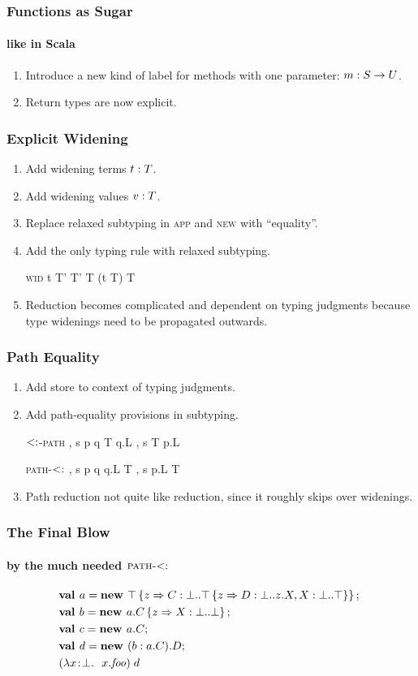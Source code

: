 \documentclass{beamer}
\begin{document}
\begin{frame}
\frametitle{Functions as Sugar}
\framesubtitle{like in Scala}
\begin{enumerate}
\item Introduce a new kind of label for methods with one parameter: $m : S \rightarrow U$.
\item Return types are now explicit.
\end{enumerate}
\end{frame}

\begin{frame}
\frametitle{Explicit Widening}
\begin{enumerate}
\item Add widening terms $t : T$.
\item Add widening values $v : T$.
\item Replace relaxed subtyping in \textsc{app} and \textsc{new} with
  ``equality''.
\item Add the only typing rule with relaxed subtyping.
\begin{block}{\textsc{wid}}
  \infrule
  {\Gamma \ts t \typ T' \spcomma T' \sub T}
  {\Gamma \ts (\wid t T) \typ T}
\end{block}
\item Reduction becomes complicated and dependent on typing judgments
  because type widenings need to be propagated outwards.
\end{enumerate}
\end{frame}

\begin{frame}
\frametitle{Path Equality}
\begin{enumerate}
\item Add store to context of typing judgments.
\item Add path-equality provisions in subtyping.
\begin{block}{\textsc{$<:$-path}}
  \infrule
  {\Gamma, s \ts p \reduces q \spcomma T \sub q.L}
  {\Gamma, s \ts T \sub p.L}
\end{block}
\begin{block}{\textsc{path-$<:$}}
  \infrule
  {\Gamma, s \ts p \reduces q \spcomma q.L \sub T}
  {\Gamma, s \ts p.L \sub T}
\end{block}
\item Path reduction not quite like reduction, since it roughly skips
  over widenings.
\end{enumerate}
\end{frame}

\begin{frame}
\frametitle{The Final Blow}
\framesubtitle{by the much needed $\textsc{path-$<:$}$}
\begin{align*}
&\mlnew a {\Top \refine z {\Ldecl C \Bot {\Top \refine z {\Ldecl D \Bot {z.X}, \Ldecl X \Bot \Top}}}}{
\mlnew b {{a.C} \refine z {\Ldecl X \Bot \Bot}}}{
\mlnew c {a.C}}{
\mlnew d {(\wid b {a.C}).D}}{
\app {(\abs x \Bot {x.\mathit{foo}})} d
}
\end{align*}
\end{frame}
\end{document}
